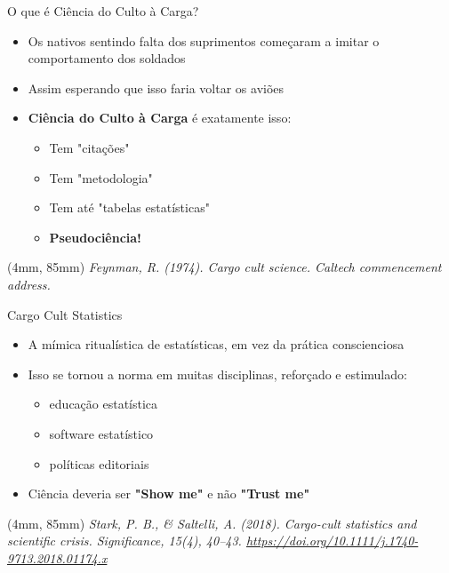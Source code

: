 \documentclass[12pt, xcolor=dvipsnames]{beamer}
\newenvironment{reference}[2]{                                    %
  \begin{textblock*}{\textwidth}(#1, #2)
      \tiny\it\bgroup\color{red!70!QPblue}}{\egroup\end{textblock*}}
\begin{document}
\begin{frame}{O que é Ciência do Culto à Carga?}
  \begin{itemize}
    \item<2-> Os nativos sentindo falta dos suprimentos começaram a imitar o comportamento dos soldados
    \item<3-> Assim esperando que isso faria voltar os aviões 
    \item<5-> \textbf{Ciência do Culto à Carga} é exatamente isso:
    \begin{itemize}
      \item<6-> Tem "citações"
      \item<7-> Tem "metodologia"
      \item<8-> Tem até "tabelas estatísticas"  
      \item<10-> \textbf{Pseudociência!}
    \end{itemize}
  \end{itemize}
  \begin{reference}{4mm}{85mm}
    Feynman, R. (1974). Cargo cult science. Caltech commencement address.
  \end{reference}
\end{frame}


\begin{frame}{Cargo Cult Statistics}
  \begin{itemize}
      \item<2-> A mímica ritualística de estatísticas, em vez da prática conscienciosa
      \item<3-> Isso se tornou a norma em muitas disciplinas, reforçado e estimulado:
      \begin{itemize}
        \item<4-> educação estatística
        \item<5-> software estatístico
        \item<6-> políticas editoriais
      \end{itemize}
      \item<7-> Ciência deveria ser \textbf{"Show me"} e não \textbf{"Trust me"}
    \end{itemize}
  \begin{reference}{4mm}{85mm}
    Stark, P. B., \& Saltelli, A. (2018). Cargo-cult statistics and scientific crisis. Significance, 15(4), 40–43.
    \url{https://doi.org/10.1111/j.1740-9713.2018.01174.x}
  \end{reference}
\end{frame}
\end{document}
